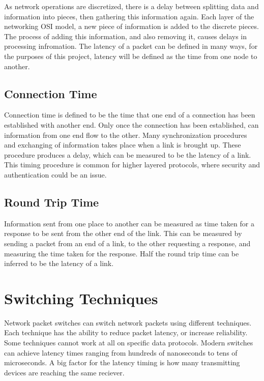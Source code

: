 \par As network operations are discretized, there is a delay between splitting data and information into pieces, then gathering this information again.
Each layer of the networking OSI model, a new piece of information is added to the discrete pieces.
The process of adding this information, and also removing it, causes delays in processing infromation.
The latency of a packet can be defined in many ways, for the purposes of this project, latency will be defined as the time from one node to another.

\subsection{Connection Time}

\par Connection time is defined to be the time that one end of a connection has been established with another end.
Only once the connection has been established, can information from one end flow to the other.
Many synchronization procedures and exchanging of information takes place when a link is brought up.
These procedure produces a delay, which can be measured to be the latency of a link.
This timing procedure is common for higher layered protocols, where security and authentication could be an issue.

\subsection{Round Trip Time}

\par Information sent from one place to another can be measured as time taken for a response to be sent from the other end of the link.
This can be measured by sending a packet from an end of a link, to the other requesting a response, and measuring the time taken for the response.
Half the round trip time can be inferred to be the latency of a link.

\section{Switching Techniques}

\par Network packet switches can switch network packets using different techniques.
Each technique has the ability to reduce packet latency, or increase reliability. 
Some techniques cannot work at all on specific data protocols.
Modern switches can achieve latency times ranging from hundreds of nanoseconds to tens of microseconds.
A big factor for the latency timing is how many transmitting devices are reaching the same reciever.

